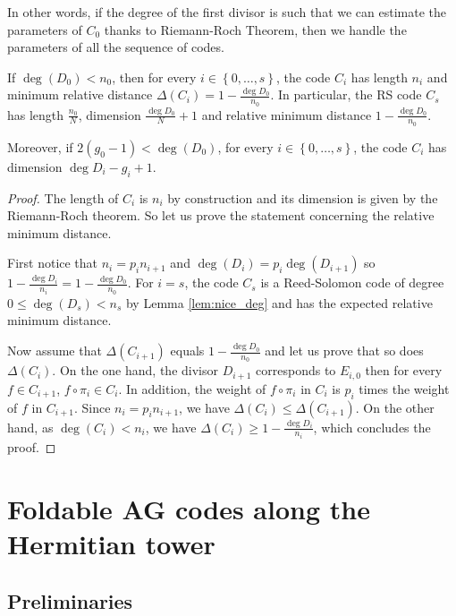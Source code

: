 \documentclass[10pt,a4paper]{article}
\newcommand{\set}[1]{\left\{#1\right\}}
\newcommand{\Range}[2]{\set{#1,\dots,#2}}
\theoremstyle{plain}
\theoremstyle{plain}
\theoremstyle{definition}
\theoremstyle{remark}
\theoremstyle{plain}
\begin{document}
In other words, if the degree of the first divisor is such that we can estimate the parameters of $C_0$ thanks to Riemann-Roch Theorem, then we handle the parameters of all the sequence of codes.

\begin{proposition}\label{prop:dist_min_Kummer}
	If $\deg(D_0) < n_0$, then for every $i \in \Range{0}{s}$, the code $C_i$ has length $n_i$ and minimum relative distance $\Delta(C_i)=1- \frac{\deg D_0}{n_0}$. In particular, the RS code $C_s$ has length $\frac{n_0}{N}$, dimension $\frac{\deg D_0}{N} + 1$ and relative minimum distance $1- \frac{\deg D_0}{n_0}$.
	
	Moreover, if $2(g_0-1) < \deg(D_0)$, for every $i \in \Range{0}{s}$, the code $C_i$ has dimension $\deg D_i -g_i +1$.
\end{proposition}

\begin{proof}
	The length of $C_i$ is $n_i$ by construction and its dimension is given by the Riemann-Roch theorem. So let us prove the statement concerning the relative minimum distance.
	
	First notice that $n_i=p_i n_{i+1}$  and $\deg(D_i)=p_i \deg(D_{i+1})$ so $1- \frac{\deg D_i}{n_i}=1- \frac{\deg D_0}{n_0}$. 
	For $i=s$, the code $C_s$ is a Reed-Solomon code of degree $0 \leq \deg(D_s) < n_s$ by Lemma \ref{lem:nice_deg} and has the expected relative minimum distance.
	
	Now assume that $\Delta(C_{i+1})$ equals $1- \frac{\deg D_{0}}{n_{0}}$ and let us prove that so does $\Delta(C_i)$. 
	On the one hand, the divisor $D_{i+1}$ corresponds to $E_{i,0}$ then for every $f \in C_{i+1}$, $f \circ \pi_i \in C_i$. In addition, the weight of $f \circ \pi_i$ in $C_i$ is $p_i$ times the weight of $f$ in $C_{i+1}$. Since $n_i=p_i n_{i+1}$, we have $\Delta(C_i) \leq \Delta(C_{i+1})$. On the other hand, as $\deg(C_i) < n_i$, we have $\Delta(C_i) \geq 1- \frac{\deg{D_i}}{n_i}$, which concludes the proof. 
\end{proof}



\section{Foldable AG codes along the Hermitian tower}\label{subsec:HermitianTower}

\subsection{Preliminaries}
\end{document}
